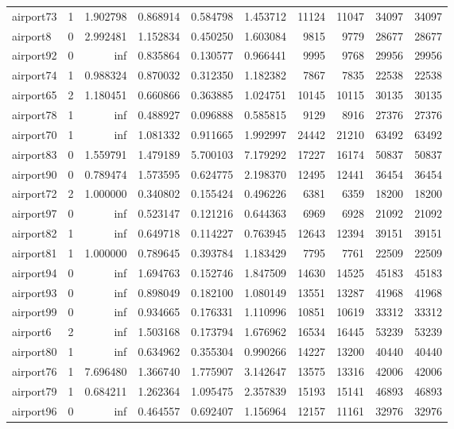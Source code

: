 \begin{longtable}{|l|r|r|r|r|r|r|r|r|r|}
airport73 & 1 & 1.902798 & 0.868914 & 0.584798 & 1.453712 & 11124 & 11047 & 34097 & 34097 \\
airport8 & 0 & 2.992481 & 1.152834 & 0.450250 & 1.603084 & 9815 & 9779 & 28677 & 28677 \\
airport92 & 0 & inf & 0.835864 & 0.130577 & 0.966441 & 9995 & 9768 & 29956 & 29956 \\
airport74 & 1 & 0.988324 & 0.870032 & 0.312350 & 1.182382 & 7867 & 7835 & 22538 & 22538 \\
airport65 & 2 & 1.180451 & 0.660866 & 0.363885 & 1.024751 & 10145 & 10115 & 30135 & 30135 \\
airport78 & 1 & inf & 0.488927 & 0.096888 & 0.585815 & 9129 & 8916 & 27376 & 27376 \\
airport70 & 1 & inf & 1.081332 & 0.911665 & 1.992997 & 24442 & 21210 & 63492 & 63492 \\
airport83 & 0 & 1.559791 & 1.479189 & 5.700103 & 7.179292 & 17227 & 16174 & 50837 & 50837 \\
airport90 & 0 & 0.789474 & 1.573595 & 0.624775 & 2.198370 & 12495 & 12441 & 36454 & 36454 \\
airport72 & 2 & 1.000000 & 0.340802 & 0.155424 & 0.496226 & 6381 & 6359 & 18200 & 18200 \\
airport97 & 0 & inf & 0.523147 & 0.121216 & 0.644363 & 6969 & 6928 & 21092 & 21092 \\
airport82 & 1 & inf & 0.649718 & 0.114227 & 0.763945 & 12643 & 12394 & 39151 & 39151 \\
airport81 & 1 & 1.000000 & 0.789645 & 0.393784 & 1.183429 & 7795 & 7761 & 22509 & 22509 \\
airport94 & 0 & inf & 1.694763 & 0.152746 & 1.847509 & 14630 & 14525 & 45183 & 45183 \\
airport93 & 0 & inf & 0.898049 & 0.182100 & 1.080149 & 13551 & 13287 & 41968 & 41968 \\
airport99 & 0 & inf & 0.934665 & 0.176331 & 1.110996 & 10851 & 10619 & 33312 & 33312 \\
airport6 & 2 & inf & 1.503168 & 0.173794 & 1.676962 & 16534 & 16445 & 53239 & 53239 \\
airport80 & 1 & inf & 0.634962 & 0.355304 & 0.990266 & 14227 & 13200 & 40440 & 40440 \\
airport76 & 1 & 7.696480 & 1.366740 & 1.775907 & 3.142647 & 13575 & 13316 & 42006 & 42006 \\
airport79 & 1 & 0.684211 & 1.262364 & 1.095475 & 2.357839 & 15193 & 15141 & 46893 & 46893 \\
airport96 & 0 & inf & 0.464557 & 0.692407 & 1.156964 & 12157 & 11161 & 32976 & 32976 \\

\end{longtable}
